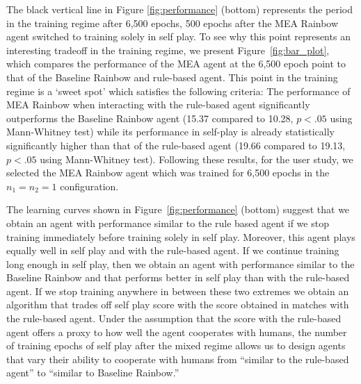 \documentclass[letterpaper]{article} %
\begin{document}
The black vertical line in Figure \ref{fig:performance} (bottom) represents the period in the training regime  after 6,500 epochs, 500 epochs after the MEA Rainbow agent switched to training solely in self play. 
To see why this point represents an interesting tradeoff in the training regime, we present 
 Figure~\ref{fig:bar_plot}, which  compares  the performance of the MEA agent at the 6,500 epoch point to that of the Baseline Rainbow and rule-based agent. 
    This point in the training regime is a `sweet spot' which satisfies the following criteria: The performance of  MEA Rainbow when interacting with the rule-based agent significantly outperforms the Baseline Rainbow agent  (15.37 compared to 10.28, $p < .05$ using Mann-Whitney test) 
    while its performance in self-play is already statistically significantly higher than that of the rule-based agent (19.66 compared to 19.13,  $p < .05$ using Mann-Whitney test). 
    Following these results, for the user study, we selected the MEA Rainbow agent which was trained for 6,500 epochs in the $n_1=n_2=1$ configuration.
    
    The learning curves shown in Figure~\ref{fig:performance} (bottom) suggest that we obtain an agent with performance similar to the rule based agent if we stop training immediately before training solely in self play. Moreover, this agent plays equally well in self play and with the rule-based agent. If we continue training long enough in self play, then we obtain an agent with performance similar to the Baseline Rainbow and that performs better in self play than with the rule-based agent. If we stop training anywhere in between these two extremes we obtain an algorithm that trades off self play score with the score obtained in matches with the rule-based agent. %
    Under the assumption that the score with the rule-based agent offers a proxy to how well the agent cooperates with humans, the number of training epochs of self play after the mixed regime allows us to design agents that vary their ability to cooperate with humans from ``similar to the rule-based agent'' to ``similar to Baseline Rainbow.''
    
\end{document}
